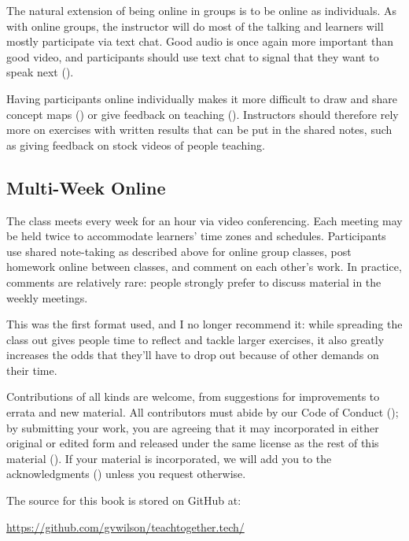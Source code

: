 The natural extension of being online in groups is to be online as individuals.
As with online groups,
the instructor will do most of the talking and learners will mostly participate via text chat.
Good audio is once again more important than good video,
and participants should use text chat to signal that they want to speak next ().

Having participants online individually makes it more difficult to draw and share concept maps ()
or give feedback on teaching ().
Instructors should therefore rely more on exercises with written results that can be put in the shared notes,
such as giving feedback on stock videos of people teaching.

\subsection*{Multi-Week Online}

The class meets every week for an hour via video conferencing.
Each meeting may be held twice to accommodate learners' time zones and schedules.
Participants use shared note-taking as described above for online group classes,
post homework online between classes,
and comment on each other's work.
In practice,
comments are relatively rare:
people strongly prefer to discuss material in the weekly meetings.

This was the first format used,
and I no longer recommend it:
while spreading the class out gives people time to reflect and tackle larger exercises,
it also greatly increases the odds that they'll have to drop out because of other demands on their time.


Contributions of all kinds are welcome,
from suggestions for improvements to errata and new material.
All contributors must abide by our Code of Conduct ();
by submitting your work,
you are agreeing that it may incorporated in either original or edited form
and released under the same license as the rest of this material ().
If your material is incorporated,
we will add you to the acknowledgments () unless you request otherwise.

The source for this book is stored on GitHub at:

\begin{center}
  \url{https://github.com/gvwilson/teachtogether.tech/}
\end{center}

